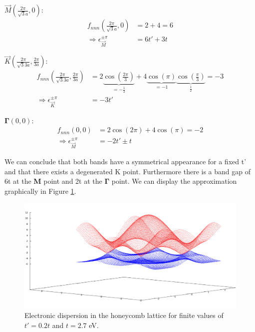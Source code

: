 		\begin{compactenum}
			\item $\vec M \left(\frac{2\pi}{\sqrt{3}a}, 0\right)$:
				\begin{equation}
					\begin{split}
						f_{nnn} \left(\frac{2\pi}{\sqrt{3}a}, 0\right) &= 2 + 4 = 6 \\
						\Rightarrow \epsilon_\vec M^{\pm \pi} &= 6t'+ 3t
					\end{split} 
				\end{equation}
			\item $\vec K \left( \frac{2\pi}{\sqrt{3}3a}, \frac{2\pi}{3 a} \right)$:
				\begin{equation}
					\begin{split}
						f_{nnn} \left( \frac{2\pi}{\sqrt{3}3a}, \frac{2\pi}{3 a} \right) &= 2 \underbrace{\cos \left( \frac{2\pi}{3} \right)}_{= - \frac{1}{2}} + 4 \underbrace{\cos (\pi)}_{= -1} \underbrace{\cos \left( \frac{\pi}{3} \right)}_{\frac{1}{2}} = -3\\
						\Rightarrow \epsilon_\vec K^{\pm \pi} &= -3t' 
					\end{split}
				\end{equation}
			\item $\boldsymbol \Gamma (0,0):$
				\begin{equation}
					\begin{split}
						f_{nnn}(0,0) &= 2\cos(2\pi) + 4 \cos(\pi) = -2 \\
						\Rightarrow \epsilon_\vec M^{\pm \pi} &= -2t' \pm t
					\end{split}
				\end{equation}
		\end{compactenum}
		We can conclude that both bands have a symmetrical appearance for a fixed t' and that there exists a degenerated K point. Furthermore there is a band gap of 6t at the \textbf{M} point and 2t at the $\boldsymbol{\Gamma}$ point. We can display the approximation graphically in Figure \ref{fig:tightbinding3dplot}.
		\begin{figure}[h]
			\centering
			\includegraphics[width=1\textwidth]{figures/TightBinding/tightbinding3dplot.png}
			\caption{Electronic dispersion in the honeycomb lattice for finite values of $t'=0.2t$ and $t=2.7$ eV.}
			\label{fig:tightbinding3dplot}
		\end{figure}
		
